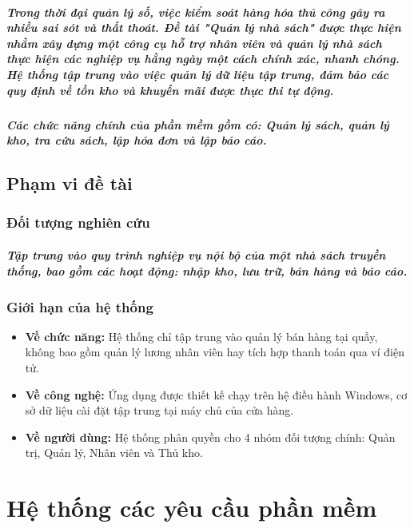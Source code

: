 \documentclass[12pt]{report}
\begin{document}
    \paragraph{Trong thời đại quản lý số, việc kiểm soát hàng hóa thủ công gây ra nhiều sai sót và thất thoát. Đề tài "Quản lý nhà sách" được thực hiện nhằm xây dựng một công cụ hỗ trợ nhân viên và quản lý nhà sách thực hiện các nghiệp vụ hằng ngày một cách chính xác, nhanh chóng. Hệ thống tập trung vào việc quản lý dữ liệu tập trung, đảm bảo các quy định về tồn kho và khuyến mãi được thực thi tự động.}
    \paragraph{Các chức năng chính của phần mềm gồm có: Quản lý sách, quản lý kho, tra cứu sách, lập hóa đơn và lập báo cáo.}
    \section{Phạm vi đề tài}
        \subsection{Đối tượng nghiên cứu}
        \paragraph{Tập trung vào quy trình nghiệp vụ nội bộ của một nhà sách truyền thống, bao gồm các hoạt động: nhập kho, lưu trữ, bán hàng và báo cáo.}
        \subsection{Giới hạn của hệ thống}
        \begin{itemize}
            \item \textbf{Về chức năng:} Hệ thống chỉ tập trung vào quản lý bán hàng tại quầy, không bao gồm quản lý lương nhân viên hay tích hợp thanh toán qua ví điện tử.
            \item \textbf{Về công nghệ:} Ứng dụng được thiết kế chạy trên hệ điều hành Windows, cơ sở dữ liệu cài đặt tập trung tại máy chủ của cửa hàng.
            \item \textbf{Về người dùng:} Hệ thống phân quyền cho 4 nhóm đối tượng chính: Quản trị, Quản lý, Nhân viên và Thủ kho.
        \end{itemize}

\chapter{Hệ thống các yêu cầu phần mềm}
\end{document}
